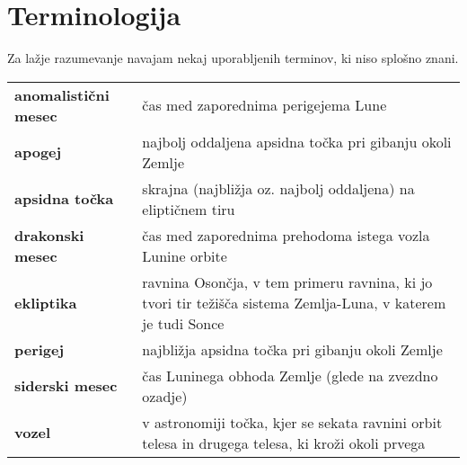 \documentclass{article}
\begin{document}
\newpage

\section*{Terminologija}
Za lažje razumevanje navajam nekaj uporabljenih terminov, ki niso splošno znani.

\renewcommand{\arraystretch}{2}
\begin{tabular}{@{}p{}p{}}
    \bf anomalistični mesec & čas med zaporednima perigejema Lune\\
    \bf apogej & najbolj oddaljena apsidna točka pri gibanju okoli Zemlje\\
    \bf apsidna točka & skrajna (najbližja oz. najbolj oddaljena) na eliptičnem tiru\\
    \bf drakonski mesec & čas med zaporednima prehodoma istega vozla Lunine orbite\\
    \bf ekliptika & ravnina Osončja, v tem primeru ravnina, ki jo tvori tir težišča sistema Zemlja-Luna, v katerem je tudi Sonce\\
    \bf perigej & najbližja apsidna točka pri gibanju okoli Zemlje\\
    \bf siderski mesec & čas Luninega obhoda Zemlje (glede na zvezdno ozadje)\\
    \bf vozel & v astronomiji točka, kjer se sekata ravnini orbit telesa in drugega telesa, ki kroži okoli prvega
\end{tabular}\\

\newpage

\printbibliography
{}
    
\end{document}

